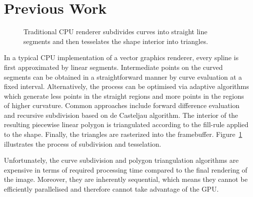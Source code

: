 \documentclass[11pt,a4paper,twoside]{article}
\begin{document}
\section {Previous Work}

\begin {figure} [h]
	\centering
	\hspace{2.0cm}
	\caption {Traditional CPU renderer subdivides curves into straight line segments and then tesselates the shape interior into triangles.}
	\label {fig:cpu}
\end {figure}

In a typical CPU implementation of a vector graphics renderer, every spline is first approximated by linear segments. Intermediate points on the curved segments can be obtained in a straightforward manner by curve evaluation at a fixed interval. Alternatively, the process can be optimised via adaptive algorithms which generate less points in the straight regions and more points in the regions of higher curvature. Common approaches include forward difference evaluation and recursive subdivision based on de Casteljau algorithm. The interior of the resulting piecewise linear polygon is triangulated according to the fill-rule applied to the shape. Finally, the triangles are rasterized into the framebuffer. Figure~\ref{fig:cpu} illustrates the process of subdivision and tesselation.

Unfortunately, the curve subdivision and polygon triangulation algorithms are expensive in terms of required processing time compared to the final rendering of the image. Moreover, they are inherently sequential, which means they cannot be efficiently parallelised and therefore cannot take advantage of the GPU.
\end{document}

